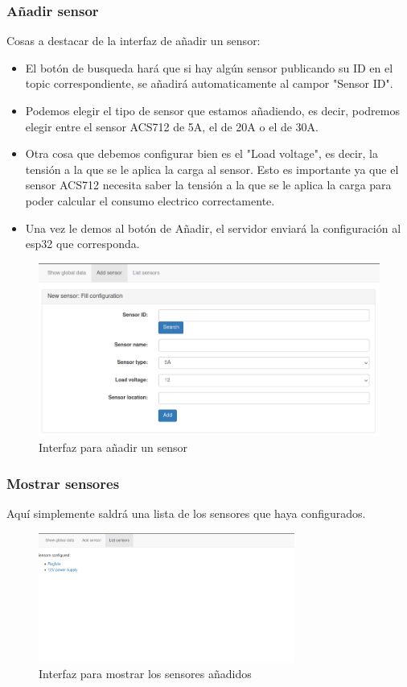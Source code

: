 \begin{titlepage}
\subsubsection{Añadir sensor}
Cosas a destacar de la interfaz de añadir un sensor:
\begin{itemize}
	\item El botón de busqueda hará que si hay algún sensor publicando su ID en el topic correspondiente, se añadirá automaticamente al campor "Sensor ID".
	\item Podemos elegir el tipo de sensor que estamos añadiendo, es decir, podremos elegir entre el sensor ACS712 de 5A, el de 20A o el de 30A.
	\item Otra cosa que debemos configurar bien es el "Load voltage", es decir, la tensión a la que se le aplica la carga al sensor. Esto es importante ya que el sensor ACS712 necesita saber la tensión a la que se le aplica la carga para poder calcular el consumo electrico correctamente.
	\item Una vez le demos al botón de Añadir, el servidor enviará la configuración al esp32 que corresponda.
\end{itemize}
\begin{figure}[h!]
	\centering
	\includegraphics[width=1\textwidth]{imagenes/web_addsensor.png}
	\caption{Interfaz para añadir un sensor}
\end{figure}
\subsubsection{Mostrar sensores}
Aquí simplemente saldrá una lista de los sensores que haya configurados.
\begin{figure}[h!]
	\centering
	\includegraphics[width=0.75\textwidth]{imagenes/web_listsensors.png}
	\caption{Interfaz para mostrar los sensores añadidos}
\end{figure}
\newpage


\end{titlepage}
